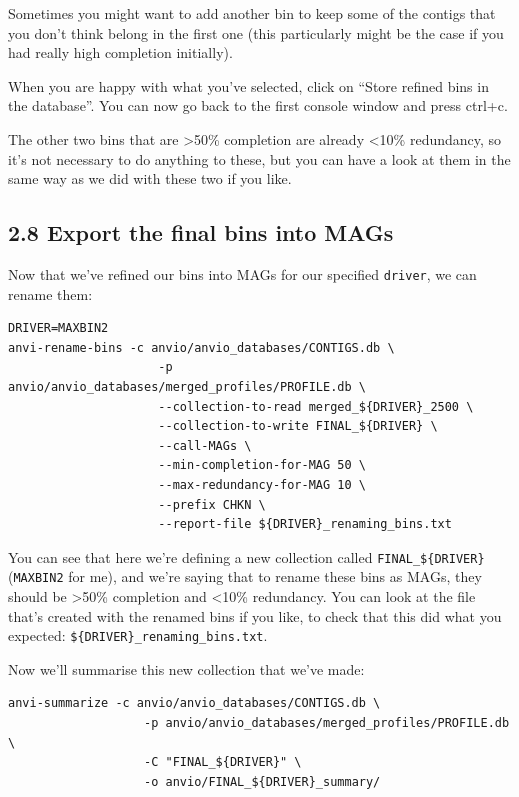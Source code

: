 \documentclass[
]{book}
\begin{document}
Sometimes you might want to add another bin to keep some of the contigs that you don't think belong in the first one (this particularly might be the case if you had really high completion initially).

When you are happy with what you've selected, click on ``Store refined bins in the database''. You can now go back to the first console window and press ctrl+c.

The other two bins that are \textgreater50\% completion are already \textless10\% redundancy, so it's not necessary to do anything to these, but you can have a look at them in the same way as we did with these two if you like.

\subsection{2.8 Export the final bins into MAGs}\label{export-the-final-bins-into-mags}

Now that we've refined our bins into MAGs for our specified \texttt{driver}, we can rename them:

\begin{verbatim}
DRIVER=MAXBIN2
anvi-rename-bins -c anvio/anvio_databases/CONTIGS.db \
                     -p anvio/anvio_databases/merged_profiles/PROFILE.db \
                     --collection-to-read merged_${DRIVER}_2500 \
                     --collection-to-write FINAL_${DRIVER} \
                     --call-MAGs \
                     --min-completion-for-MAG 50 \
                     --max-redundancy-for-MAG 10 \
                     --prefix CHKN \
                     --report-file ${DRIVER}_renaming_bins.txt
\end{verbatim}

You can see that here we're defining a new collection called \texttt{FINAL\_\$\{DRIVER\}} (\texttt{MAXBIN2} for me), and we're saying that to rename these bins as MAGs, they should be \textgreater50\% completion and \textless10\% redundancy. You can look at the file that's created with the renamed bins if you like, to check that this did what you expected: \texttt{\$\{DRIVER\}\_renaming\_bins.txt}.

Now we'll summarise this new collection that we've made:

\begin{verbatim}
anvi-summarize -c anvio/anvio_databases/CONTIGS.db \
                   -p anvio/anvio_databases/merged_profiles/PROFILE.db \
                   -C "FINAL_${DRIVER}" \
                   -o anvio/FINAL_${DRIVER}_summary/
\end{verbatim}
\end{document}
